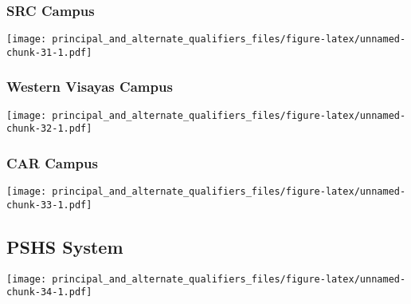 \documentclass[]{article}
\begin{document}
\hypertarget{src-campus}{%
\subsubsection{SRC Campus}\label{src-campus}}

\texttt{[image: principal\_and\_alternate\_qualifiers\_files/figure-latex/unnamed-chunk-31-1.pdf]}

\hypertarget{western-visayas-campus}{%
\subsubsection{Western Visayas Campus}\label{western-visayas-campus}}

\texttt{[image: principal\_and\_alternate\_qualifiers\_files/figure-latex/unnamed-chunk-32-1.pdf]}

\hypertarget{car-campus-1}{%
\subsubsection{CAR Campus}\label{car-campus-1}}

\texttt{[image: principal\_and\_alternate\_qualifiers\_files/figure-latex/unnamed-chunk-33-1.pdf]}

\hypertarget{pshs-system}{%
\subsection{PSHS System}\label{pshs-system}}

\texttt{[image: principal\_and\_alternate\_qualifiers\_files/figure-latex/unnamed-chunk-34-1.pdf]}
\end{document}
